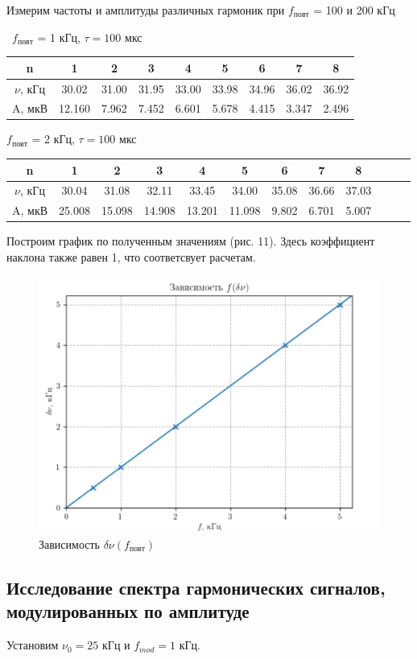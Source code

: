 \documentclass[12pt,a4paper]{article}
\begin{document}
    Измерим частоты и амплитуды различных гармоник при $f_{повт}$ = 100 и 200 кГц
    \newline
\begin{table}[h!]
    \
    $f_{повт}$ = 1 кГц, $\tau = 100$ мкс 

    \begin{tabular}[]{|c|c|c|c|c|c|c|c|c|}
        \hline
        n &  1& 2& 3& 4& 5 & 6& 7 & 8 \\
        \hline
        $\nu$, кГц &  30.02 & 31.00& 31.95& 33.00&33.98 & 34.96 &36.02&36.92\\
        \hline
        A, мкВ& 12.160& 7.962& 7.452 & 6.601 & 5.678& 4.415& 3.347& 2.496 \\
        \hline
    \end{tabular}
    \newline

    $f_{повт}$ = 2 кГц, $\tau = 100$ мкс 

    \begin{tabular}[]{|c|c|c|c|c|c|c|c|c|c|c|c|}
        \hline
        n & 1& 2& 3& 4& 5 & 6& 7 & 8 \\
        \hline
        $\nu$, кГц &  30.04 & 31.08& 32.11& 33.45&34.00 & 35.08 &36.66&37.03\\
        \hline
        A, мкВ& 25.008& 15.098& 14.908 & 13.201 & 11.098& 9.802& 6.701& 5.007 \\
        \hline
    \end{tabular}
\end{table}

    Построим график по полученным значениям (рис. 11). 
    Здесь коэффициент наклона также равен 1, что соответсвует расчетам.
    \begin{figure}[h!]
    \centering
    \includegraphics[width=0.4\linewidth]{f(v).png}
    \caption{Зависимость $\delta\nu (f_{повт})$}
\end{figure}

\newpage 

\subsection{Исследование спектра гармонических сигналов, модулированных по амплитуде}
Установим $\nu_0 = 25$ кГц и $f_{mod} = 1$ кГц.
\end{document}

